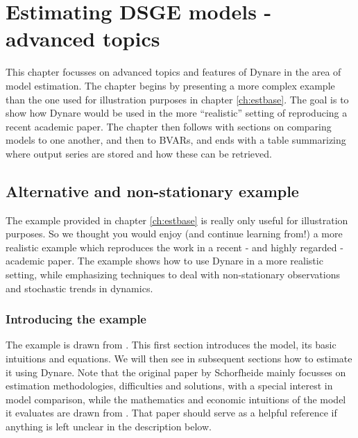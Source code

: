 \chapter{Estimating DSGE models - advanced topics} \label{ch:estadv}

This chapter focusses on advanced topics and features of Dynare in the area of model estimation. The chapter begins by presenting a more complex example than the one used for illustration purposes in chapter \ref{ch:estbase}. The goal is to show how Dynare would be used in the more ``realistic'' setting of reproducing a recent academic paper. The chapter then follows with sections on comparing models to one another, and then to BVARs, and ends with a table summarizing where output series are stored and how these can be retrieved. \\


\section{Alternative and non-stationary example}
The example provided in chapter \ref{ch:estbase} is really only useful for illustration purposes. So we thought you would enjoy (and continue learning from!) a more realistic example which reproduces the work in a recent - and highly regarded - academic paper. The example shows how to use Dynare in a more realistic setting, while emphasizing techniques to deal with non-stationary observations and stochastic trends in dynamics. \\

\subsection{Introducing the example}
The example is drawn from \citet{Schorfheide2000}. This first section introduces the model, its basic intuitions and equations. We will then see in subsequent sections how to estimate it using Dynare. Note that the original paper by Schorfheide mainly focusses on estimation methodologies, difficulties and solutions, with a special interest in model comparison, while the mathematics and economic intuitions of the model it evaluates are drawn from \citet{CogleyNason1994}. That paper should serve as a helpful reference if anything is left unclear in the description below.\\

